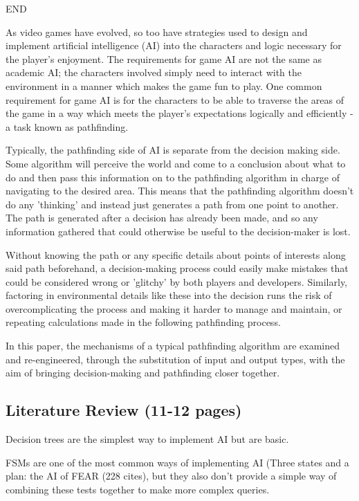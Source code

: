 \documentclass[10pt]{article}
\begin{document}
END

As video games have evolved, so too have strategies used to design and implement artificial intelligence (AI) into the characters and logic necessary for the player's enjoyment. The requirements for game AI are not the same as academic AI; the characters involved simply need to interact with the environment in a manner which makes the game fun to play. One common requirement for game AI is for the characters to be able to traverse the areas of the game in a way which meets the player's expectations logically and efficiently - a task known as pathfinding.

Typically, the pathfinding side of AI is separate from the decision making side. Some algorithm will perceive the world and come to a conclusion about what to do and then pass this information on to the pathfinding algorithm in charge of navigating to the desired area. This means that the pathfinding algorithm doesn't do any 'thinking' and instead just generates a path from one point to another. The path is generated after a decision has already been made, and so any information gathered that could otherwise be useful to the decision-maker is lost.

Without knowing the path or any specific details about points of interests along said path beforehand, a decision-making process could easily make mistakes that could be considered wrong or 'glitchy' by both players and developers. Similarly, factoring in environmental details like these into the decision runs the risk of overcomplicating the process and making it harder to manage and maintain, or repeating calculations made in the following pathfinding process.

In this paper, the mechanisms of a typical pathfinding algorithm are examined and re-engineered, through the substitution of input and output types, with the aim of bringing decision-making and pathfinding closer together.

\subsection{Literature Review (11-12 pages)}

Decision trees are the simplest way to implement AI but are basic.

FSMs are one of the most common ways of implementing AI (Three states and a plan: the AI of FEAR (228 cites), but they also don't provide a simple way of combining these tests together to make more complex queries.
\end{document}
